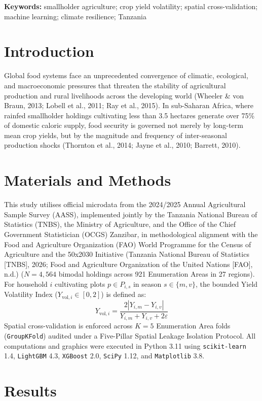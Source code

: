 \documentclass[10pt,a4paper]{article}
\begin{document}
\noindent\textbf{Keywords:} smallholder agriculture; crop yield volatility; spatial cross-validation; machine learning; climate resilience; Tanzania

\section{Introduction}
Global food systems face an unprecedented convergence of climatic, ecological, and macroeconomic pressures that threaten the stability of agricultural production and rural livelihoods across the developing world (Wheeler \& von Braun, 2013; Lobell et al., 2011; Ray et al., 2015). In sub-Saharan Africa, where rainfed smallholder holdings cultivating less than 3.5 hectares generate over 75\% of domestic caloric supply, food security is governed not merely by long-term mean crop yields, but by the magnitude and frequency of inter-seasonal production shocks (Thornton et al., 2014; Jayne et al., 2010; Barrett, 2010).

\section{Materials and Methods}
This study utilises official microdata from the 2024/2025 Annual Agricultural Sample Survey (AASS), implemented jointly by the Tanzania National Bureau of Statistics (TNBS), the Ministry of Agriculture, and the Office of the Chief Government Statistician (OCGS) Zanzibar, in methodological alignment with the Food and Agriculture Organization (FAO) World Programme for the Census of Agriculture and the 50x2030 Initiative (Tanzania National Bureau of Statistics [TNBS], 2026; Food and Agriculture Organization of the United Nations [FAO], n.d.) ($N = 4,564$ bimodal holdings across 921 Enumeration Areas in 27 regions). For household $i$ cultivating plots $p \in P_{i,s}$ in season $s \in \{m, v\}$, the bounded Yield Volatility Index ($Y_{\mathrm{vol},i} \in [0, 2]$) is defined as:
\begin{equation}
Y_{\mathrm{vol},i} = \frac{2|Y_{i,m} - Y_{i,v}|}{Y_{i,m} + Y_{i,v} + 2\varepsilon}
\end{equation}
Spatial cross-validation is enforced across $K = 5$ Enumeration Area folds (\texttt{GroupKFold}) audited under a Five-Pillar Spatial Leakage Isolation Protocol. All computations and graphics were executed in Python 3.11 using \texttt{scikit-learn} 1.4, \texttt{LightGBM} 4.3, \texttt{XGBoost} 2.0, \texttt{SciPy} 1.12, and \texttt{Matplotlib} 3.8.

\section{Results}
\end{document}
